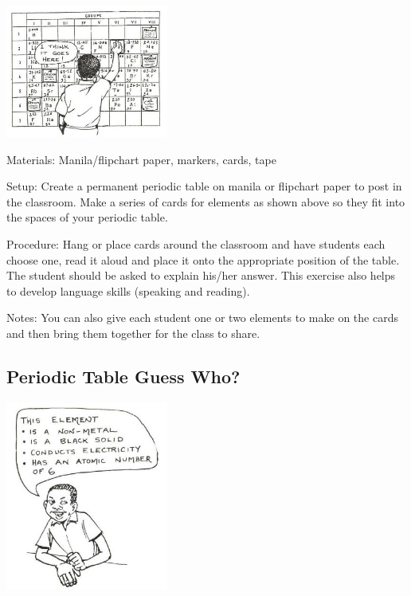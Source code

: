 \begin{multicols}{2}
\begin{center}
\includegraphics[width=0.4\textwidth]{./img/source/periodic-table-game.jpg}
\end{center}

\begin{description*}
\item[Materials:]{Manila/flipchart paper, markers, cards, tape}
\item[Setup:]{Create a permanent periodic table on manila or flipchart paper to post in the classroom. Make a series of cards for elements as
shown above so they fit into the spaces of your
periodic table. }
\item[Procedure:]{Hang or place cards around the classroom and have students each choose one, read it aloud and place it onto the
appropriate position of the table. The
student should be asked to explain his/her
answer. This exercise also helps to develop
language skills (speaking and reading).}
\item[Notes:]{You can also give each student one or two elements to make on the cards and then bring them together for the class to share.}
\end{description*}

\subsection{Periodic Table Guess Who?}

\begin{center}
\includegraphics[width=0.4\textwidth]{./img/source/periodic-guess-who.jpg}
\end{center}


\end{multicols}
